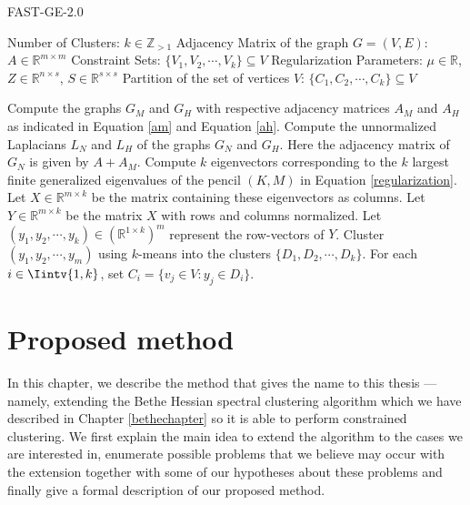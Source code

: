 \begin{algorithm}
\caption{FAST-GE-2.0}\label{fastge2alg}
\begin{algorithmic}[1]
   \Require 
      \Statex Number of Clusters: $k \in \mathbb Z_{>1}$
      \Statex Adjacency Matrix of the graph $G=(V,E)$: $A \in \mathbb R ^ {m \times m}$ 
      \Statex Constraint Sets: $\{ V_1, V_2, \cdots, V_k \} \subseteq V$
      \Statex Regularization Parameters: $\mu \in \mathbb R$, $Z \in \mathbb R ^{n \times s}$, $S \in \mathbb R ^{s \times s}$
   \Ensure 
      \Statex Partition of the set of vertices $V$: $\{ C_1, C_2, \cdots, C_k \} \subseteq V$
      \vspace{0.2 cm}

   \State Compute the graphs $G_M$ and $G_H$ with respective adjacency matrices $A_M$ and $A_H$ as indicated in Equation \vref{am} and Equation \vref{ah}.
   \State Compute the unnormalized Laplacians $L_N$ and $L_H$ of the graphs $G_N$ and $G_H$. Here the adjacency matrix of $G_N$ is given by $A + A_M$.
   \State Compute $k$ eigenvectors corresponding to the $k$ largest finite generalized eigenvalues of the pencil $(K,M)$ in Equation \vref{regularization}. Let $X \in \mathbb R ^{m \times k}$ be the matrix containing these eigenvectors as columns.
   \State Let $Y \in \mathbb R ^{m \times k}$ be the matrix $X$ with rows and columns normalized.
   \State Let $(y_1, y_2, \cdots, y_k) \in (\mathbb R^{1 \times k})^m$ represent the row-vectors of $Y$.
   \State Cluster $(y_1, y_2, \cdots, y_m)$ using $k$-means into the clusters $ \{ D_1, D_2, \cdots, D_k \}$.
   \State For each $i \in \Iintv{1,k}$, set $C_i = \{ v_j \in V: y_j \in D_i \}$.
\end{algorithmic}
\end{algorithm}



\chapter{Proposed method} \label{proposed_chapter}
In this chapter, we describe the method that gives the name to this thesis --- namely, extending the Bethe Hessian spectral clustering algorithm which we have described in Chapter \ref{bethechapter} so it is able to perform constrained clustering.
We first explain the main idea to extend the algorithm to the cases we are interested in, enumerate possible problems that we believe may occur with the extension together with some of our hypotheses about these problems and finally give a formal description of our proposed method.

